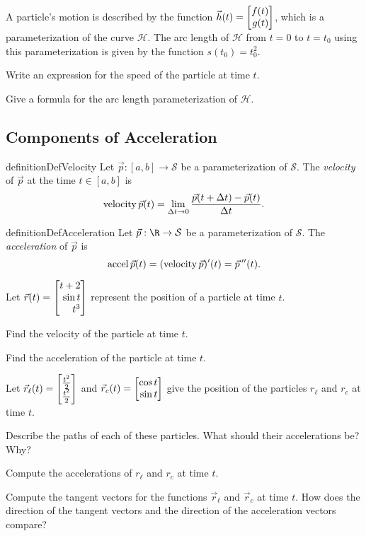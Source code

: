 \begin{question}
	A particle's motion is described by the function $\vec h(t) = \mat{f(t)\\ g(t)}$,  which is a 
	parameterization of the curve $\mathcal H$.  The arc length of $\mathcal H$ from $t=0$ to
	$t=t_0$ using this parameterization is given by the function $s(t_0) = t_0^2$.
	\begin{parts}
		\item Write an expression for the speed of the particle at time $t$.
		\item Give a formula for the arc length parameterization of $\mathcal H$.
	\end{parts}
\end{question}

\subsection*{Components of Acceleration}
\begin{restatable*}[Velocity]{definition}{DefVelocity}
	Let $\vec p:[a,b]\to\mathcal S$ be a parameterization of $\mathcal S$.  The
	\emph{velocity} of $\vec p$ at the time $t\in[a,b]$ is 
	\[
		\operatorname{velocity} \vec p(t) = \lim_{\Delta t\to 0} \frac{\vec p(t+\Delta t) - \vec p(t)}{\Delta t}.	
	\]
\end{restatable*}
\begin{restatable*}[Acceleration]{definition}{DefAcceleration}
	Let $\vec p:\R\to\mathcal S$ be a parameterization of $\mathcal S$.  The \emph{acceleration}
	of $\vec p$ is 
	\[
		\operatorname{accel} \vec p(t) = (\operatorname{velocity} \vec p)'(t)=\vec p\,''(t).
	\]
\end{restatable*}

\begin{question}
	Let $\vec r(t) = \mat{t+2\\ \sin t\\ t^3}$ represent the position of a particle at time $t$.
	\begin{parts}
		\item Find the velocity of the particle at time $t$.
		\item Find the acceleration of the particle at time $t$.
	\end{parts}
\end{question}

\begin{question}
	Let $\vec r_\ell(t) = \mat{\frac{t^2}{2}\\\frac{t^2}{2}}$ and $\vec r_c(t) = \mat{\cos t\\ \sin t}$ give the position
	of the particles $r_\ell$ and $r_c$ at time $t$.
	\begin{parts}
		\item Describe the paths of each of these particles.  What should their accelerations be?  Why?
		\item Compute the accelerations of $r_\ell$ and $r_c$ at time $t$.
		\item Compute the tangent vectors for the functions $\vec r_\ell$ and $\vec r_c$ at time $t$.
			How does the direction of the tangent vectors and the direction of the acceleration vectors
			compare?
	\end{parts}
\end{question}

